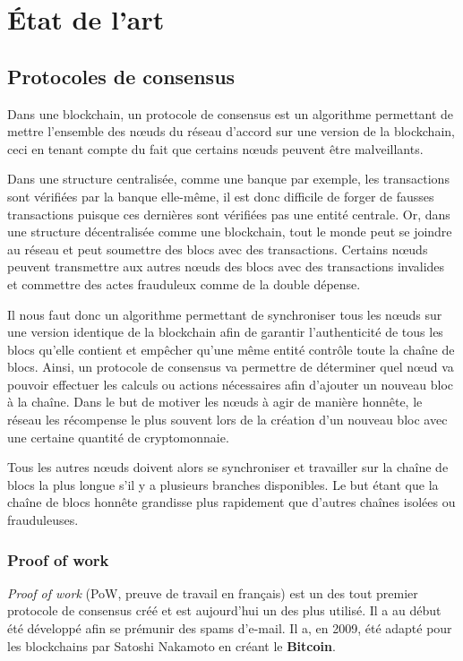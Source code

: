 \chapter{État de l'art}
\label{ch:etat_art}

\section{Protocoles de consensus}

Dans une blockchain, un protocole de consensus est un algorithme permettant de mettre l'ensemble des nœuds du réseau d'accord sur une version de la blockchain, ceci en tenant compte du fait que certains nœuds peuvent être malveillants.

Dans une structure centralisée, comme une banque par exemple, les transactions sont vérifiées par la banque elle-même, il est donc difficile de forger de fausses transactions puisque ces dernières sont vérifiées pas une entité centrale. Or, dans une structure décentralisée comme une blockchain, tout le monde peut se joindre au réseau et peut soumettre des blocs avec des transactions. Certains nœuds peuvent transmettre aux autres nœuds des blocs avec des transactions invalides et commettre des actes frauduleux comme de la double dépense.

Il nous faut donc un algorithme permettant de synchroniser tous les nœuds sur une version identique de la blockchain afin de garantir l'authenticité de tous les blocs qu'elle contient et empêcher qu'une même entité contrôle toute la chaîne de blocs. Ainsi, un protocole de consensus va permettre de déterminer quel nœud va pouvoir effectuer les calculs ou actions nécessaires afin d'ajouter un nouveau bloc à la chaîne. Dans le but de motiver les nœuds à agir de manière honnête, le réseau les récompense le plus souvent lors de la création d'un nouveau bloc avec une certaine quantité de cryptomonnaie. 

Tous les autres nœuds doivent alors se synchroniser et travailler sur la chaîne de blocs la plus longue s'il y a plusieurs branches disponibles. Le but étant que la chaîne de blocs honnête grandisse plus rapidement que d'autres chaînes isolées ou frauduleuses.

\subsection{Proof of work}
\label{consensus:pow}

\textit{Proof of work} (PoW, preuve de travail en français) est un des tout premier protocole de consensus créé et est aujourd'hui un des plus utilisé. Il a au début été développé afin se prémunir des spams d'e-mail. Il a, en 2009, été adapté pour les blockchains par Satoshi Nakamoto en créant le \textbf{Bitcoin}.


